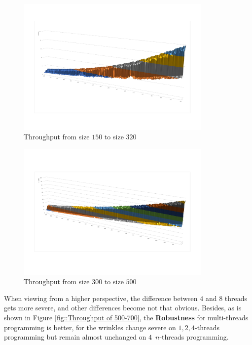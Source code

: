 \documentclass[12pt,a4paper]{article}
\begin{document}
\begin{minipage}{0.5\textwidth}
	\begin{figure}[H]
		\centering
		\includegraphics[width=0.85\textwidth]{./fig/1_n_thread_150-320.pdf}
		\caption{Throughput  from size $150$ to size $320$}
		\label{fig::Throughput of 150-320}
	\end{figure}
\end{minipage}
\begin{minipage}{0.5\textwidth}
	\begin{figure}[H]
		\centering
		\includegraphics[width=0.85\textwidth]{./fig/1_n_thread_300-500.pdf}
		\caption{Throughput from size $300$ to size $500$}
		\label{fig::Throughput of 300-500}
	\end{figure}
\end{minipage}

When viewing from a higher perspective, the difference between $4$ and $8$ threads gets more severe, and other differences become not that obvious. Besides, as is shown in Figure \ref{fig::Throughput of 500-700}, the \textbf{Robustness} for multi-threads programming is better, for the wrinkles change severe on $1,2,4$-threads programming but remain almost unchanged on $4$~$n$-threads programming.
\end{document}
